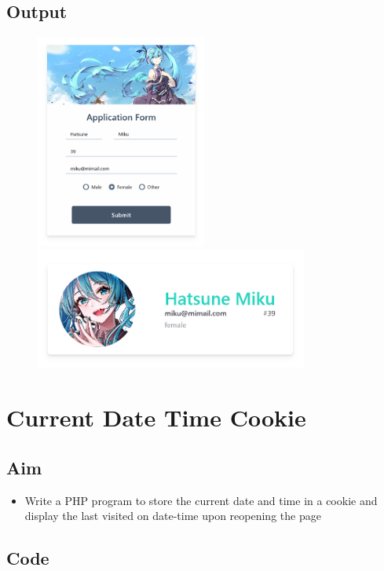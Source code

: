 \documentclass{article}
\begin{document}
\subsection{Output}
\begin{figure}[h!]
	\centering
	\includegraphics[width=0.5\textwidth]{./Assets/p2401.png}
	\includegraphics[width=0.8\textwidth]{./Assets/p2402.png}
\end{figure}
\newpage

\section{Current Date Time Cookie}
\subsection{Aim}
\begin{itemize}
  \item Write a PHP program to store the current date and time in a cookie and display the last visited on date-time upon reopening the page
\end{itemize}

\subsection{Code}
\inputminted[frame=lines, breaklines, breakanywhere, numberblanklines=false]{php}{./prog_25/index.php}
\end{document}
